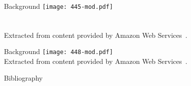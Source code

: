 \documentclass[t,handout]{beamer}   %
\begin{document}
\begin{frame}{Background}
 	\texttt{[image: 445-mod.pdf]} \\~\\~\\
 	{\tiny Extracted from content provided by Amazon Web Services~\cite{Aws:15}.}
\end{frame}

\begin{frame}{Background}
 	\texttt{[image: 448-mod.pdf]} \\
 	{\tiny Extracted from content provided by Amazon Web Services~\cite{Aws:15}.}
\end{frame}

\begin{frame}{Bibliography}
 	\def\newblock{}	
	\printbibliography
\end{frame}
\end{document}
